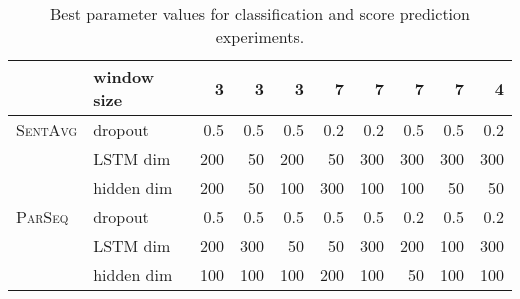 \documentclass[11pt,a4paper]{article}
\newcommand \parseq{\textsc{ParSeq}\xspace}
\newcommand \sentavg{\textsc{SentAvg}\xspace}
\begin{document}
\begin{table*}
\begin{center}
\begin{footnotesize}
\begin{tabular}{llrrrrrrrr}
        & window size & 3 & 3 & 3 & 7 & 7 & 7 & 7 & 4 \\
\midrule
\sentavg 	& dropout & 0.5 & 0.5 & 0.5 & 0.2 & 0.2 & 0.5 & 0.5 & 0.2  \\
			& LSTM dim & 200 & 50 & 200 & 50 & 300 & 300 & 300 & 300 \\
           	& hidden dim & 200 & 50 & 100 & 300 & 100 & 100 & 50 & 50 \\
            \midrule
\parseq	& dropout & 0.5 & 0.5 & 0.5 & 0.5 & 0.5 & 0.2 & 0.5 & 0.2 \\
		& LSTM dim & 200 & 300 & 50 & 50 & 300 & 200 & 100 & 300  \\
        & hidden dim & 100 & 100 & 100 & 200 & 100 & 50 & 100 & 100 \\
\bottomrule
\end{tabular}
\end{footnotesize}
\caption{Best parameter values for classification and score prediction experiments.}
\label{tab:param_vals1}
\end{center}
\end{table*} 
\end{document}

